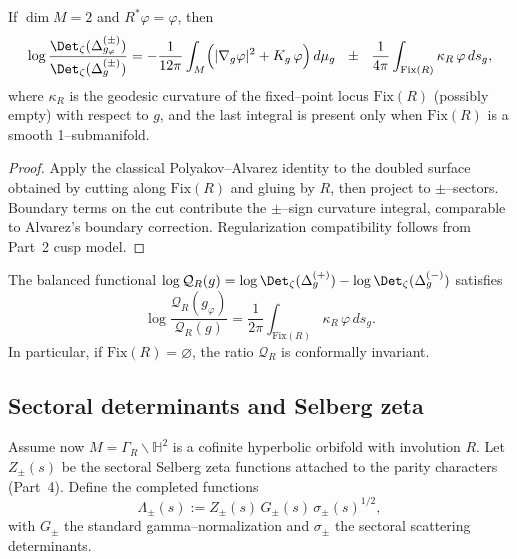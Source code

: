 \begin{theorem}
\label{thm:polyakov-2d}
If $\dim M=2$ and $R^*\varphi=\varphi$, then
\[
\log\frac{\Det_\zeta(\Delta_{g_\varphi}^{(\pm)})}{\Det_\zeta(\Delta_{g}^{(\pm)})}
= -\frac{1}{12\pi}\int_M\!\Big(|\nabla_g \varphi|^2 + K_g\,\varphi\Big)\,d\mu_g
\ \ \pm\ \ \frac{1}{4\pi}\int_{\mathrm{Fix}(R)} \kappa_R\,\varphi\,ds_g,
\]
where $\kappa_R$ is the geodesic curvature of the fixed–point locus $\mathrm{Fix}(R)$ (possibly empty) with respect to $g$, and the last integral is present only when $\mathrm{Fix}(R)$ is a smooth 1–submanifold.  %
\end{theorem}

\begin{proof}
Apply the classical Polyakov–Alvarez identity to the doubled surface obtained by cutting along $\mathrm{Fix}(R)$ and gluing by $R$, then project to $\pm$–sectors. Boundary terms on the cut contribute the $\pm$–sign curvature integral, comparable to Alvarez’s boundary correction. Regularization compatibility follows from Part~2 cusp model.  %
\end{proof}

\begin{corollary}
\label{cor:balanced-2d}
The balanced functional $\log\mathcal{Q}_R(g)=\log\Det_\zeta(\Delta_g^{(+)})-\log\Det_\zeta(\Delta_g^{(-)})$ satisfies
\[
\log\frac{\mathcal{Q}_R(g_\varphi)}{\mathcal{Q}_R(g)}
= \frac{1}{2\pi}\int_{\mathrm{Fix}(R)} \kappa_R\,\varphi\,ds_g.
\]
In particular, if $\mathrm{Fix}(R)=\varnothing$, the ratio $\mathcal{Q}_R$ is conformally invariant.  %
\end{corollary}


\subsection{Sectoral determinants and Selberg zeta}
\label{subsec:ch6-part6-selberg} \relax \hspace{0pt}
Assume now $M=\Gamma_R\backslash\mathbb H^2$ is a cofinite hyperbolic orbifold with involution $R$. Let $Z_\pm(s)$ be the sectoral Selberg zeta functions attached to the parity characters (Part~4). Define the completed functions
\[
\Lambda_\pm(s):=Z_\pm(s)\,G_\pm(s)\, \sigma_\pm(s)^{1/2},
\]
with $G_\pm$ the standard gamma–normalization and $\sigma_\pm$ the sectoral scattering determinants.  %

